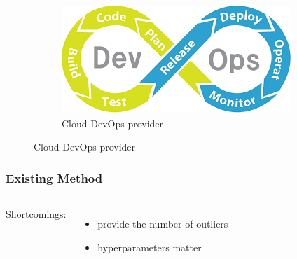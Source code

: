\documentclass[notheorems]{beamer}
\begin{document}
\begin{frame}
\begin{figure}
	\begin{subfigure}{0.33\textwidth}
		\includegraphics[width=\textwidth]{pic/general_workflow.png}
		\caption{Cloud DevOps provider}
	\end{subfigure}
\end{figure}  
\end{frame}
\begin{frame}
\frametitle{Existing Method}
	\begin{columns}
\quad Shortcomings:
\begin{itemize}
\item provide the number of outliers
\item hyperparameters matter
\end{itemize}
\end{columns}
\end{frame}
\end{document}
